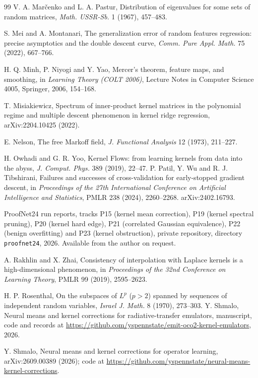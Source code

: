 \documentclass[11pt]{article}
\theoremstyle{definition}
\begin{document}
\begin{thebibliography}{99}
 V. A. Mar\v{c}enko and L. A. Pastur, Distribution of eigenvalues for some
sets of random matrices, \emph{Math. USSR-Sb.} 1 (1967), 457--483.

 S. Mei and A. Montanari, The generalization error of random features
regression: precise asymptotics and the double descent curve, \emph{Comm. Pure Appl. Math.} 75
(2022), 667--766.

 H. Q. Minh, P. Niyogi and Y. Yao, Mercer's theorem, feature maps, and
smoothing, in \emph{Learning Theory (COLT 2006)}, Lecture Notes in Computer Science 4005, Springer,
2006, 154--168.

 T. Misiakiewicz, Spectrum of inner-product kernel matrices in the polynomial
regime and multiple descent phenomenon in kernel ridge regression, arXiv:2204.10425 (2022).


 E. Nelson, The free Markoff field, \emph{J. Functional Analysis} 12 (1973), 211--227.

 H. Owhadi and G. R. Yoo, Kernel Flows: from learning kernels from data into the abyss, \emph{J. Comput. Phys.} 389 (2019), 22--47.
 P. Patil, Y. Wu and R. J. Tibshirani, Failures and successes of cross-validation
for early-stopped gradient descent, in \emph{Proceedings of the 27th International Conference on
Artificial Intelligence and Statistics}, PMLR 238 (2024), 2260--2268. arXiv:2402.16793.

 ProofNet24 run reports, tracks P15 (kernel mean correction), P19 (kernel spectral
pruning), P20 (kernel hard edge), P21 (correlated Gaussian equivalence), P22 (benign overfitting) and
P23 (kernel obstruction), private repository, directory \texttt{proofnet24}, 2026. Available
from the author on request.

 A. Rakhlin and X. Zhai, Consistency of interpolation with Laplace kernels is a
high-dimensional phenomenon, in \emph{Proceedings of the 32nd Conference on Learning Theory}, PMLR
99 (2019), 2595--2623.


 H. P. Rosenthal, On the subspaces of $L^p$ ($p>2$) spanned by sequences of independent random variables, \emph{Israel J. Math.} 8 (1970), 273--303.
 Y. Shmalo, Neural means and kernel corrections for radiative-transfer
emulators, manuscript, code and records at
\url{https://github.com/yspennstate/emit-oco2-kernel-emulators}, 2026.

 Y. Shmalo, Neural means and kernel corrections for operator learning,
arXiv:2609.00389 (2026); code at \url{https://github.com/yspennstate/neural-means-kernel-corrections}.



\end{thebibliography}
\end{document}
